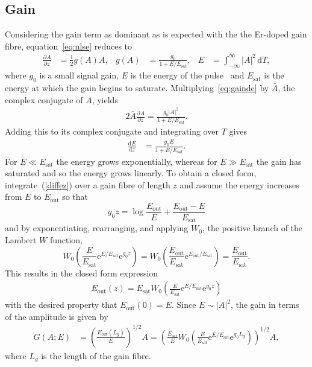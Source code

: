 \documentclass[12pt]{article}
\providecommand{\df}{\textrm{d}}
\newcommand{\diff}[3][]{\frac{\textrm{d}^{#1}#2}{\textrm{d}{#3}^{#1}}}
\newcommand{\pdiff}[3][]{\frac{\partial^{#1}#2}{\partial{#3}^{#1}}}
\newcommand{\Es}{E_{\textrm{sat}}}
\begin{document}
\subsection{Gain}
Considering the gain term as dominant as is expected with the the Er-doped gain fibre, equation~\eqref{eq:nlse} reduces to
\begin{align}
\label{eq:gainde}
	\pdiff{A}{z} &= \frac{1}{2} g(A) A,& g(A) &= \frac{g_0}{1 + E / \Es},& E &= \int_{-\infty}^\infty |A|^2 \, \df T,
\end{align}
where $g_0$ is a small signal gain, $E$ is the energy of the pulse~\cite{bohun, burgoyne2014, shtyrina, silfvast, yarutkina} and $\Es$ is the energy at which the gain begins to saturate.
Multiplying~\eqref{eq:gainde} by $\bar{A}$, the complex conjugate of $A$, yields
\begin{align*}
	2\bar{A} \pdiff{A}{z} = \frac{g_0 |A|^2}{1 + E / \Es}.
\end{align*}
Adding this to its complex conjugate and integrating over $T$ gives
\begin{align}
\label{diffez}
	\diff{E}{z} &= \frac{g_0 E}{1 + E / \Es}.
\end{align}
For $E \ll \Es$ the energy grows exponentially, whereas for $E \gg \Es$ the gain has saturated and so the energy grows linearly. To obtain a closed form, integrate~(\ref{diffez}) over a gain fibre of length $z$ and assume the energy increases from $E$ to $E_{\textrm{out}}$ so that
\[
	g_0 z = \log\frac{E_{\textrm{out}}}{E} + \frac{E_{\textrm{out}}-E}{\Es}
\]
and by exponentiating, rearranging, and applying $W_0$, the positive branch of the Lambert $W$ function,
\[
	 W_0\left(\frac{E}{\Es} \textrm{e}^{E/\Es} \textrm{e}^{g_0 z}\right) = 
	 W_0\left(\frac{E_{\textrm{out}}}{\Es} \textrm{e}^{E_{\textrm{out}}/\Es}\right) = \frac{E_{\textrm{out}}}{\Es}.
\]
This results in the closed form expression
\begin{align}
\label{eq:energy}
	E_{\textrm{out}}(z) = \Es W_0 \left( \frac{E}{\Es} \textrm{e}^{E/\Es} \textrm{e}^{g_0 z} \right)
\end{align}
with the desired property that $E_{\textrm{out}}(0)=E$. Since $E \sim |A|^2$, the gain in terms of the amplitude is given by
\begin{align}
\label{eq:gain}
	G(A;E) &= \left(\frac{E_{\textrm{out}}(L_g)}{E}\right)^{1/2}A = 
	\left( \frac{\Es}{E} W_0 \left( \frac{E}{\Es} \textrm{e}^{E/\Es} 
	\textrm{e}^{g_0 L_g} \right) \right)^{1/2} A,
\end{align}
where $L_g$ is the length of the gain fibre.
\end{document}

